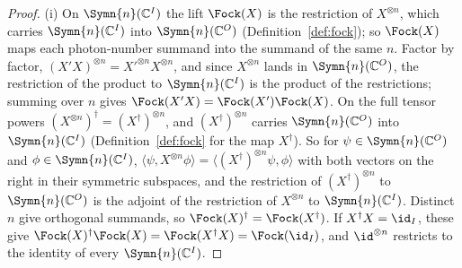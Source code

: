 \begin{proof}
(i) On $\Symn{n}(\mathbb{C}^{I})$ the lift $\Fock(X)$ is the restriction of
$X^{\otimes n}$, which carries $\Symn{n}(\mathbb{C}^{I})$ into
$\Symn{n}(\mathbb{C}^{O})$ (Definition~\ref{def:fock}); so $\Fock(X)$ maps
each photon-number summand into the summand of the same $n$. Factor by
factor, $(X'X)^{\otimes n}=X'^{\otimes n}X^{\otimes n}$, and since
$X^{\otimes n}$ lands in $\Symn{n}(\mathbb{C}^{O})$, the restriction of the
product to $\Symn{n}(\mathbb{C}^{I})$ is the product of the restrictions;
summing over $n$ gives $\Fock(X'X)=\Fock(X')\Fock(X)$. On the full tensor
powers $(X^{\otimes n})^{\dagger}=(X^{\dagger})^{\otimes n}$, and
$(X^{\dagger})^{\otimes n}$ carries $\Symn{n}(\mathbb{C}^{O})$ into
$\Symn{n}(\mathbb{C}^{I})$ (Definition~\ref{def:fock} for the map
$X^{\dagger}$). So for $\psi\in\Symn{n}(\mathbb{C}^{O})$ and
$\phi\in\Symn{n}(\mathbb{C}^{I})$,
$\langle\psi,X^{\otimes n}\phi\rangle=\langle(X^{\dagger})^{\otimes n}\psi,\phi\rangle$
with both vectors on the right in their symmetric subspaces, and the
restriction of $(X^{\dagger})^{\otimes n}$ to $\Symn{n}(\mathbb{C}^{O})$ is
the adjoint of the restriction of $X^{\otimes n}$ to
$\Symn{n}(\mathbb{C}^{I})$. Distinct $n$ give orthogonal summands, so
$\Fock(X)^{\dagger}=\Fock(X^{\dagger})$. If $X^{\dagger}X=\id_{I}$, these give
$\Fock(X)^{\dagger}\Fock(X)=\Fock(X^{\dagger}X)=\Fock(\id_{I})$, and
$\id^{\otimes n}$ restricts to the identity of every
$\Symn{n}(\mathbb{C}^{I})$.


\end{proof}
